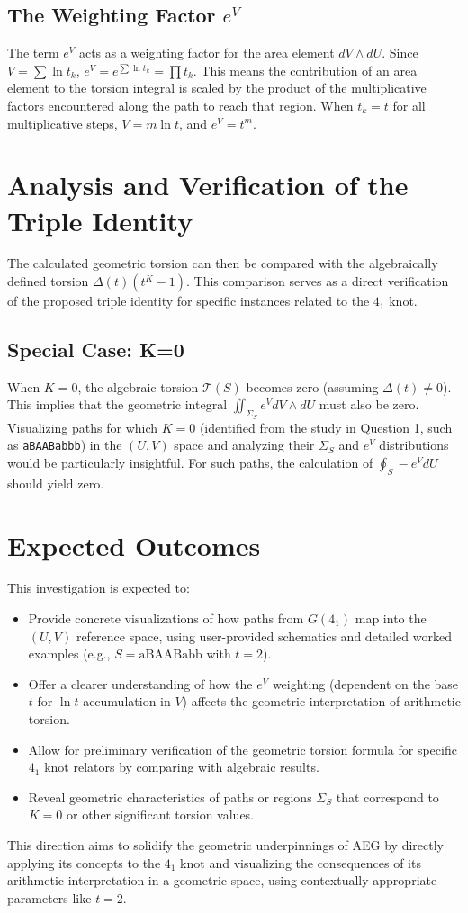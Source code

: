 \documentclass{article}
\begin{document}
\subsection{The Weighting Factor $e^V$}
The term $e^V$ acts as a weighting factor for the area element $dV \wedge dU$. Since $V = \sum \ln t_k$, $e^V = e^{\sum \ln t_k} = \prod t_k$. This means the contribution of an area element to the torsion integral is scaled by the product of the multiplicative factors encountered along the path to reach that region. When $t_k = t$ for all multiplicative steps, $V = m \ln t$, and $e^V = t^m$.

\section{Analysis and Verification of the Triple Identity}
The calculated geometric torsion can then be compared with the algebraically defined torsion $\Delta(t)(t^K-1)$. This comparison serves as a direct verification of the proposed triple identity for specific instances related to the $4_1$ knot.

\subsection{Special Case: K=0}
When $K=0$, the algebraic torsion $\mathcal{T}(S)$ becomes zero (assuming $\Delta(t) \neq 0$). This implies that the geometric integral $\iint_{\Sigma_S} e^V dV \wedge dU$ must also be zero. Visualizing paths for which $K=0$ (identified from the study in Question 1, such as \texttt{aBAABabbb}) in the $(U,V)$ space and analyzing their $\Sigma_S$ and $e^V$ distributions would be particularly insightful. For such paths, the calculation of $\oint_S -e^V dU$ should yield zero.

\section{Expected Outcomes}
This investigation is expected to:
\begin{itemize}
    \item Provide concrete visualizations of how paths from $G(4_1)$ map into the $(U,V)$ reference space, using user-provided schematics and detailed worked examples (e.g., $S = \text{aBAABabb}$ with $t=2$).
    \item Offer a clearer understanding of how the $e^V$ weighting (dependent on the base $t$ for $\ln t$ accumulation in $V$) affects the geometric interpretation of arithmetic torsion.
    \item Allow for preliminary verification of the geometric torsion formula for specific $4_1$ knot relators by comparing with algebraic results.
    \item Reveal geometric characteristics of paths or regions $\Sigma_S$ that correspond to $K=0$ or other significant torsion values.
\end{itemize}

This direction aims to solidify the geometric underpinnings of AEG by directly applying its concepts to the $4_1$ knot and visualizing the consequences of its arithmetic interpretation in a geometric space, using contextually appropriate parameters like $t=2$.
\end{document}
